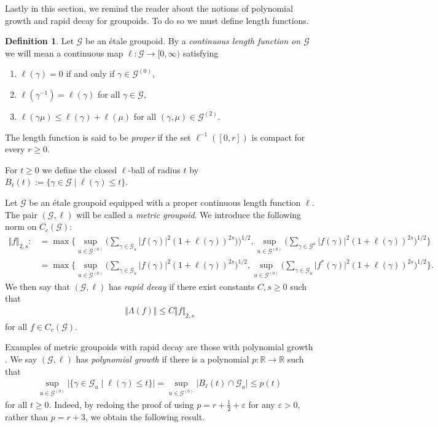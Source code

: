\documentclass[11pt,a4paper,oneside,final,reqno]{amsart}
\theoremstyle{definition}
\newtheorem{definition}[lemma]{Definition}
\newcommand{\G}{\mathcal{G}}
\newcommand{\Go}{\mathcal{G}^{(0)}}
\newcommand{\R}{\mathbb{R}}
\numberwithin{equation}{section}
\begin{document}
	
	Lastly in this section, we remind the reader about the notions of polynomial growth and rapid decay for groupoids. To do so we must define length functions.
	\begin{definition}\label{def:length-function}
		Let $\G$ be an \'etale groupoid. By a \emph{continuous length function on $\G$} we will mean a continuous map $\ell \colon \G \to [0,\infty)$ satisfying
		\begin{enumerate}
			\item $\ell(\gamma) = 0$ if and only if $\gamma \in \Go$,
			\item $\ell(\gamma^{-1}) = \ell(\gamma)$ for all $\gamma \in \G$,
			\item $\ell(\gamma \mu) \leq \ell(\gamma) + \ell(\mu)$ for all $(\gamma, \mu) \in \G^{(2)}$. 
		\end{enumerate}
		The length function is said to be \emph{proper} if the set $\ell^{-1}([0,r])$ is compact for every $r\geq 0$. 
		
		For $t \geq 0$ we define the closed $\ell$-ball of radius $t$ by $B_\ell(t) := \{ \gamma \in \G \mid \ell(\gamma) \leq t\}$. 
	\end{definition}
	Let $\G$ be an \'etale groupoid equipped with a proper continuous length function $\ell$.  
	The
	pair $(\G, \ell)$ 
	will be called 
	a \emph{metric groupoid}. We introduce the following norm on $C_c (\G)$:
	\begin{align*}
		\Vert f \Vert_{2,s} :&= \max \{ \sup_{u \in \Go} \big( \sum_{\gamma \in \G_u} \vert f(\gamma) \vert^2 (1 + \ell(\gamma))^{2s} \big))^{1/2}, \sup_{u \in \Go} \big( \sum_{\gamma \in \G^u} \vert f(\gamma) \vert^2 (1 + \ell(\gamma))^{2s} \big)^{1/2}  \} \\
		&= \max \{ \sup_{u \in \Go} \big( \sum_{\gamma \in \G_u} \vert f(\gamma) \vert^2 (1 + \ell(\gamma))^{2s} \big)^{1/2}, \sup_{u \in \Go} \big( \sum_{\gamma \in \G_u} \vert f^*(\gamma) \vert^2 (1 + \ell(\gamma))^{2s} \big)^{1/2}  \}.
	\end{align*}
	We then say that $(\G, \ell)$ has \emph{rapid decay} if there exist constants $C, s \geq 0$ such that
	\begin{align*}
		\Vert \Lambda (f) \Vert \leq C \Vert f \Vert_{2,s}
	\end{align*}
	for all $f \in C_c (\G)$. 
	
	Examples of metric groupoids with rapid decay are those with polynomial growth \cite[Proposition 3.5]{HouSpectral2017}. We say $(\G, \ell)$ has \emph{polynomial growth} if there is a polynomial $p \colon \R \to \R$ such that
	\begin{align}\label{eq:poly-growth-criterion}
		\sup_{u \in \Go} \vert \{ \gamma \in \G_u \mid \ell(\gamma)\leq t    \}  \vert = \sup_{u \in \Go} \vert B_\ell(t) \cap \G_u \vert \leq p(t) 
	\end{align}
	for all $t \geq 0$. 
	Indeed, by redoing the proof of \cite[Proposition 3.5]{HouSpectral2017} using $p = r + \frac{1}{2} + \varepsilon$ for any $\varepsilon >0$, rather than $p = r+3$, we obtain the following result.
	
\end{document}
